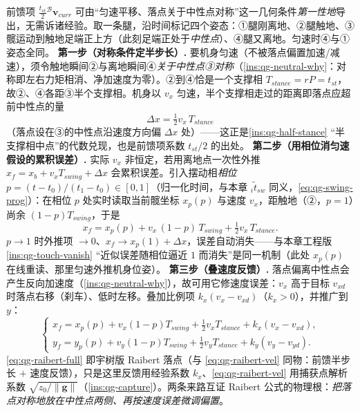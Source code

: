 \begin{derivation}\label{deriv:qg-raibert-firstprinciple}
前馈项 $\tfrac{t_{st}}{2}{}^{\mathcal{B}}\mathbf{v}_{curr}$ 可由“匀速平移、落点关于中性点对称”这一几何条件\emph{第一性地}导出\cite{unitree2023quadruped}，无需诉诸经验。取一条腿，沿时间标记四个姿态：①腿刚离地、②腿触地、③髋运动到触地足端正上方（此刻足端正处于\emph{中性点}）、④腿又离地。匀速时④与①姿态全同。
\textbf{第一步（对称条件定半步长）.} 要机身匀速（不被落点偏置加速/减速），须令触地瞬间②与离地瞬间④\emph{关于中性点③对称}（\cref{ins:qg-neutral-why}：对称即左右力矩相消、净加速度为零）。②到④恰是一个支撑相 $T_{stance}=rP=t_{st}$，故②、④各距③半个支撑相。机身以 $v_x$ 匀速，半个支撑相走过的距离即落点应超前中性点的量
\begin{equation}
  \Delta x=\tfrac12 v_x\,T_{stance}
  \label{eq:qg-raibert-halfstep}
\end{equation}
（落点设在③的中性点沿速度方向偏 $\Delta x$ 处）——这正是\cref{ins:qg-half-stance} “半支撑相中点”的代数兑现，也是前馈项系数 $t_{st}/2$ 的出处。
\textbf{第二步（用相位消匀速假设的累积误差）.} 实际 $v_x$ 非恒定，若用离地点一次性外推 $x_f=x_b+v_xT_{swing}+\Delta x$ 会累积误差。引入摆动相\emph{相位} $p=(t-t_0)/(t_1-t_0)\in[0,1]$（归一化时间，与本章 ${}_i\tilde t_{sw}$ 同义，\cref{eq:qg-swing-prog}）：在相位 $p$ 处实时读取当前髋坐标 $x_p(p)$ 与速度 $v_x$，距触地（②，$p=1$）尚余 $(1-p)T_{swing}$，于是
\begin{equation}
  x_f=x_p(p)+v_x\,(1-p)\,T_{swing}+\tfrac12 v_x\,T_{stance}.
  \label{eq:qg-raibert-phase}
\end{equation}
$p\to1$ 时外推项 $\to0$、$x_f\to x_p(1)+\Delta x$，误差自动消失——与本章工程版 \cref{ins:qg-touch-vanish} “近似误差随相位逼近 $1$ 而消失”是同一机制（此处 $x_p(p)$ 在线重读、那里匀速外推机身位姿）。
\textbf{第三步（叠速度反馈）.} 落点偏离中性点会产生反向加速度（\cref{ins:qg-neutral-why}），故可用它修速度误差：$v_x$ 高于目标 $v_{xd}$ 时落点右移（刹车）、低时左移。叠加比例项 $k_x(v_x-v_{xd})$（$k_x>0$），并推广到 $y$：
\begin{equation}
  \begin{cases}
  x_f=x_p(p)+v_x(1-p)T_{swing}+\tfrac12 v_x T_{stance}+k_x(v_x-v_{xd}),\\
  y_f=y_p(p)+v_y(1-p)T_{swing}+\tfrac12 v_y T_{stance}+k_y(v_y-v_{yd}).
  \end{cases}
  \label{eq:qg-raibert-full}
\end{equation}
\cref{eq:qg-raibert-full} 即宇树版 Raibert 落点（与 \cref{eq:qg-raibert-vel} 同物：前馈半步长 $+$ 速度反馈），只是这里反馈用经验系数 $k_x$、\cref{eq:qg-raibert-vel} 用捕获点解析系数 $\sqrt{z_0/\|\boldsymbol{g}\|}$（\cref{ins:qg-capture}）。两条来路互证 Raibert 公式的物理根：\emph{把落点对称地放在中性点两侧、再按速度误差微调偏置}。
\end{derivation}

